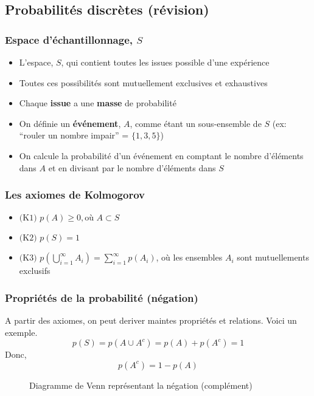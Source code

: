 \documentclass{beamer}
\begin{document}
\subsection{Probabilités discrètes (révision)}

\begin{frame}
    \frametitle{Espace d'échantillonnage, $S$}
    \begin{itemize}
      \item L'espace, $S$, qui contient toutes les issues possible d'une expérience
      \pause
      \item Toutes ces possibilités sont mutuellement exclusives et exhaustives
      \pause
      \item Chaque \textbf{issue} a une \textbf{masse} de probabilité
      \pause
      \item On définie un \textbf{événement}, $A$, comme étant un sous-ensemble de $S$ (ex: ``rouler un nombre impair'' = $\{1,3,5\}$)
      \pause
      \item On calcule la probabilité d'un événement en comptant le nombre d'éléments dans $A$ et en divisant par le nombre d'éléments dans $S$
    \end{itemize}
\end{frame}


\begin{frame}
    \frametitle{Les axiomes de Kolmogorov}
    \begin{itemize}
      \item $\textrm{(K1)} \, \, p(A) \geq 0, \textrm{où} \, \, A \subset S$
      \pause
      \item $\textrm{(K2)} \, \, p(S) = 1$
      \pause
      \item $\textrm{(K3)} \, \, p(\bigcup_{i=1}^{\infty} A_i) = \sum_{i=1}^{\infty} p(A_i)$, où les ensembles $A_i$ sont mutuellements exclusifs
    \end{itemize}
\end{frame}


\begin{frame}
    \frametitle{Propriétés de la probabilité (négation)}
    A partir des axiomes, on peut deriver maintes propriétés et relations. Voici un exemple.\\
    \pause
    \[p(S) = p(A \cup A^c) = p(A) + p(A^c) = 1\]
    \pause
    Donc,
    \[p(A^c) = 1 - p(A)\]
    \pause
    \begin{figure}
      \centering
      \scalebox{1}{}
      \caption{Diagramme de Venn représentant la négation (complément)}
    \end{figure}    
\end{frame}
\end{document}
